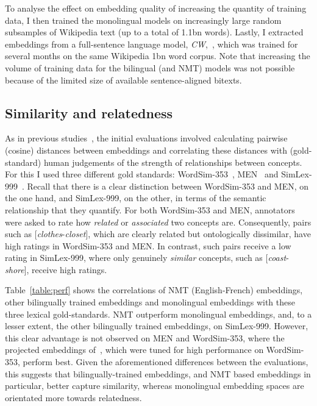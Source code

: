To analyse the effect on embedding quality of increasing the quantity of training data, I then trained the monolingual models on increasingly large random subsamples of Wikipedia text (up to a total of 1.1bn words). Lastly, I extracted embeddings from a full-sentence language model, \emph{CW},~\citep{collobert2008unified}, which was trained for several months on the same Wikipedia 1bn word corpus. Note that increasing the volume of training data for the bilingual (and NMT) models was not possible because of the limited size of available sentence-aligned bitexts. 
 
\subsection{Similarity and relatedness} As in previous studies~\citep{Agirre2009,bruni2014multimodal,baroni2014don}, the initial evaluations involved calculating pairwise (cosine) distances between embeddings and correlating these distances with (gold-standard) human judgements of the strength of relationships between concepts. For this I used three different gold standards: WordSim-353~\citep{Agirre2009}, MEN~\citep{bruni2014multimodal} and SimLex-999~\citep{hill2014simlex}. Recall that there is a clear distinction between WordSim-353 and MEN, on the one hand, and SimLex-999, on the other, in terms of the semantic relationship that they quantify. For both WordSim-353 and MEN, annotators were asked to rate how \emph{related} or \emph{associated} two concepts are. Consequently, pairs such as [\emph{clothes}-\emph{closet}], which are clearly related but ontologically dissimilar, have high ratings in WordSim-353 and MEN. In contrast, such pairs receive a low rating in SimLex-999, where only genuinely \emph{similar} concepts, such as [\emph{coast}- \emph{shore}], receive high ratings. 

Table~\ref{table:perf} shows the correlations of NMT (English-French) embeddings, other bilingually trained embeddings and monolingual embeddings with these three lexical gold-standards. NMT outperform monolingual embeddings, and, to a lesser extent, the other bilingually trained embeddings, on SimLex-999. However, this clear advantage is not observed on MEN and WordSim-353, where the projected embeddings of~\cite{faruqui2014improving}, which were tuned for high performance on WordSim-353, perform best. Given the aforementioned differences between the evaluations, this suggests that bilingually-trained embeddings, and NMT based embeddings in particular, better capture similarity, whereas monolingual embedding spaces are orientated more towards relatedness. 

